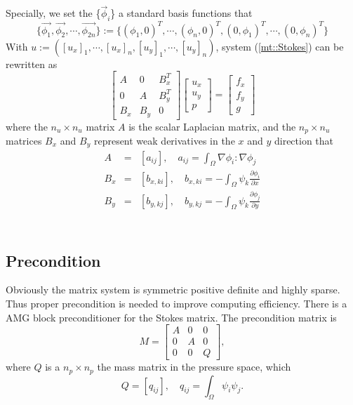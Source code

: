\documentclass[a4paper]{article}
\begin{document}
Specially, we set the \{$\vec{\phi}_i$\} a standard basis functions that
\begin{equation}
\{\vec{\phi_1},\vec{\phi_2},\cdots,\vec{\phi_{2n}} \}:=\{(\phi_1,0)^T,\cdots,(\phi_n,0)^T,(0,\phi_1)^T,\cdots,(0,\phi_n)^T\}
\label{eq::basisfunction}
\end{equation}
With $u:=([u_x]_1,\cdots,[u_x]_n,[u_y]_1,\cdots,[u_y]_n)$, system (\ref{mt::Stokes}) can be rewritten as
\begin{equation}
\left[ \begin{array}{ccc}
A & 0 & B_x^T \\
0 & A & B_y^T \\
B_x & B_y & 0
\end{array}
\right]
\left[\begin{array}{ccc}
u_x\\
u_y\\
p
\end{array}
\right]=
\left[\begin{array}{ccc}
f_x\\
f_y\\
g
\end{array}
\right]
\label{Stokes}
\end{equation}
where the $n_u \times n_u $ matrix $A$ is the scalar Laplacian matrix, and the $n_p\times n_u$ matrices $B_x$ and $B_y$ represent weak derivatives in the $x$ and $y$ direction that 	
\begin{equation}
\begin{array}{rcl}
A &=& [a_{ij}], \quad a_{ij} = \int_{\Omega} \nabla \phi_i : \nabla \phi_j \\
B_x &=& [b_{x,ki}], \quad b_{x,ki} = -\int_{\Omega} \psi_k \frac{\partial \phi_i}{\partial x} \\
B_y &=& [b_{y,kj}], \quad b_{y,kj} = -\int_{\Omega} \psi_k \frac{\partial \phi_j}{\partial y} \\
\end{array}
\label{Stokes-mtvalue}
\end{equation}
 \\
\subsection{Precondition}
Obviously the matrix system is symmetric positive definite and highly
sparse. Thus proper precondition is needed to improve computing
efficiency. There is a AMG block preconditioner for the Stokes
matrix. The precondition matrix is
\begin{equation}
M = \left[ \begin{array}{ccc}
A & 0 & 0 \\
0 & A & 0 \\
0 & 0 & Q
\end{array}
\right],
\end{equation}
where $Q$ is a $n_p\times n_p$ the mass matrix in the pressure space, which
\begin{equation}
Q = [q_{ij}], \quad q_{ij} = \int_{\Omega} \psi_i\psi_j.
\label{pr::Q}
\end{equation}
\end{document}
